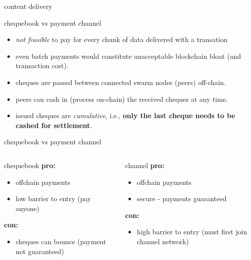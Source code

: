 \documentclass{beamer}
\begin{document}
\begin{section}{content delivery}
\begin{frame}{chequebook vs payment channel}
 \begin{itemize}
  \item \emph{not feasible} to pay for every chunk of data delivered with a transation
  \item<2-> even batch payments would constitute unacceptable blockchain bloat (and transaction cost).
 \end{itemize}
  \begin{itemize}
  \item<4-> cheques are passed between connected swarm nodes (peers) off-chain.
  \item<4-> peers can cash in (process on-chain) the received cheques at any time.
  \item<4-> issued cheques are \emph{cumulative}, i.e., \textbf{only the last cheque needs to be cashed for settlement}.
 \end{itemize}
\end{frame}

\begin{frame}{chequebook vs payment channel}
\begin{overlayarea}{\textwidth}{5.2cm}
\begin{columns}[t]
    \begin{block}{chequebook}
      \textbf{pro:}
      \begin{itemize}
       \item<1>{offchain payments}
       \item<2>{low barrier to entry (pay anyone)}
      \end{itemize}
      \textbf{con:}
      \begin{itemize}
       \item<3>{cheques can bounce (payment not guaranteed)}
      \end{itemize}
    \end{block}
    \begin{block}{channel}
      \textbf{pro:}
      \begin{itemize}
       \item<1>{offchain payments}
       \item<3>{secure - payments guaranteed}
      \end{itemize}
      \textbf{con:}
      \begin{itemize}
       \item<2>{high barrier to entry (must first join channel network)}
      \end{itemize}
    \end{block}
\end{columns}
\end{overlayarea}


\end{frame}
\end{section}
\end{document}
